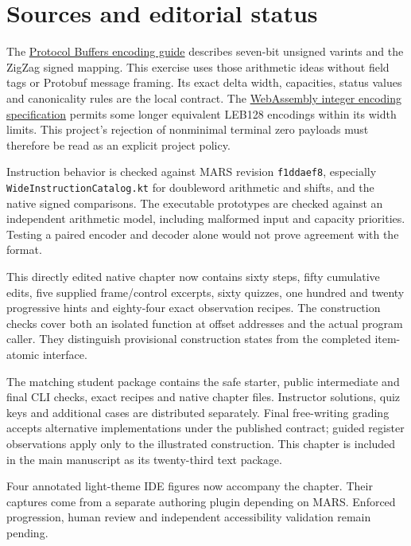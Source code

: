 \section*{Sources and editorial status}
The \href{https://protobuf.dev/programming-guides/encoding/}{Protocol Buffers encoding
  guide} describes seven-bit unsigned varints and the ZigZag signed mapping. This exercise
uses those arithmetic ideas without field tags or Protobuf message framing. Its exact
delta width, capacities, status values and canonicality rules are the local contract.
The \href{https://webassembly.github.io/spec/core/binary/values.html\#integers}{WebAssembly
  integer encoding specification} permits some longer equivalent LEB128 encodings within
its width limits. This project's rejection of nonminimal terminal zero payloads must
therefore be read as an explicit project policy.

Instruction behavior is checked against MARS revision \texttt{f1ddaef8}, especially
\texttt{WideInstructionCatalog.kt} for doubleword arithmetic and shifts, and the native
signed comparisons. The executable prototypes are checked against an independent
arithmetic model, including malformed input and capacity priorities. Testing a paired
encoder and decoder alone would not prove agreement with the format.

This directly edited native chapter now contains sixty steps, fifty cumulative edits,
five supplied frame/control excerpts, sixty quizzes, one hundred and twenty progressive
hints and eighty-four exact observation recipes. The construction checks cover both an
isolated function at offset addresses and the actual program caller. They distinguish
provisional construction states from the completed item-atomic interface.

The matching student package contains the safe starter, public intermediate and final
CLI checks, exact recipes and native chapter files. Instructor solutions, quiz keys and
additional cases are distributed separately. Final free-writing grading accepts
alternative implementations under the published contract; guided register observations
apply only to the illustrated construction. This chapter is included in the main
manuscript as its twenty-third text package.

Four annotated light-theme IDE figures now accompany the chapter. Their captures
come from a separate authoring plugin depending on MARS. Enforced progression, human
review and independent accessibility validation remain pending.

